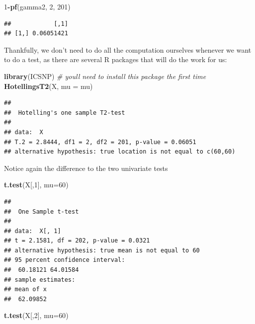 \documentclass[
]{book}
\newenvironment{Shaded}{\begin{snugshade}}{\end{snugshade}}
\newcommand{\AttributeTok}[1]{\textcolor[rgb]{0.13,0.29,0.53}{#1}}
\newcommand{\CommentTok}[1]{\textcolor[rgb]{0.56,0.35,0.01}{\textit{#1}}}
\newcommand{\DecValTok}[1]{\textcolor[rgb]{0.00,0.00,0.81}{#1}}
\newcommand{\FunctionTok}[1]{\textcolor[rgb]{0.13,0.29,0.53}{\textbf{#1}}}
\newcommand{\NormalTok}[1]{#1}
\newcommand{\SpecialCharTok}[1]{\textcolor[rgb]{0.81,0.36,0.00}{\textbf{#1}}}
\theoremstyle{definition}
\theoremstyle{definition}
\theoremstyle{definition}
\theoremstyle{definition}
\theoremstyle{remark}
\begin{document}
\begin{Shaded}
\begin{Highlighting}[]
\DecValTok{1}\SpecialCharTok{{-}}\FunctionTok{pf}\NormalTok{(gamma2, }\DecValTok{2}\NormalTok{, }\DecValTok{201}\NormalTok{)}
\end{Highlighting}
\end{Shaded}

\begin{verbatim}
##            [,1]
## [1,] 0.06051421
\end{verbatim}

Thankfully, we don't need to do all the computation ourselves whenever we want to do a test, as there are several R packages that will do the work for us:

\begin{Shaded}
\begin{Highlighting}[]
\FunctionTok{library}\NormalTok{(ICSNP) }\CommentTok{\# you\textquotesingle{}ll need to install this package the first time}
\FunctionTok{HotellingsT2}\NormalTok{(X,  }\AttributeTok{mu =}\NormalTok{ mu)}
\end{Highlighting}
\end{Shaded}

\begin{verbatim}
## 
##  Hotelling's one sample T2-test
## 
## data:  X
## T.2 = 2.8444, df1 = 2, df2 = 201, p-value = 0.06051
## alternative hypothesis: true location is not equal to c(60,60)
\end{verbatim}

Notice again the difference to the two univariate tests

\begin{Shaded}
\begin{Highlighting}[]
\FunctionTok{t.test}\NormalTok{(X[,}\DecValTok{1}\NormalTok{], }\AttributeTok{mu=}\DecValTok{60}\NormalTok{)}
\end{Highlighting}
\end{Shaded}

\begin{verbatim}
## 
##  One Sample t-test
## 
## data:  X[, 1]
## t = 2.1581, df = 202, p-value = 0.0321
## alternative hypothesis: true mean is not equal to 60
## 95 percent confidence interval:
##  60.18121 64.01584
## sample estimates:
## mean of x 
##  62.09852
\end{verbatim}

\begin{Shaded}
\begin{Highlighting}[]
\FunctionTok{t.test}\NormalTok{(X[,}\DecValTok{2}\NormalTok{], }\AttributeTok{mu=}\DecValTok{60}\NormalTok{)}
\end{Highlighting}
\end{Shaded}
\end{document}
